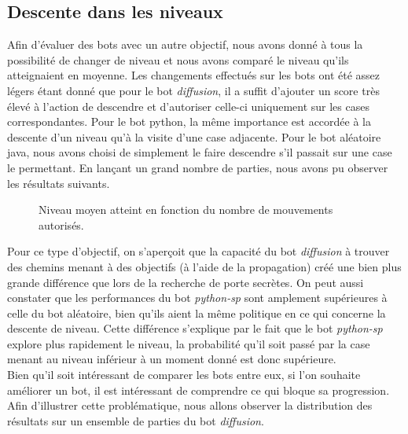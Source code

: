 \documentclass[a4paper,12pt]{article}
\begin{document}
\subsection{Descente dans les niveaux}

Afin d'évaluer des bots avec un autre objectif, nous avons donné à tous la
possibilité de changer de niveau et nous avons comparé le niveau qu'ils
atteignaient en moyenne. Les changements effectués sur les bots ont été assez
légers étant donné que pour le bot {\em diffusion}, il a suffit d'ajouter un
score très élevé à l'action de descendre et d'autoriser celle-ci uniquement sur
les cases correspondantes. Pour le bot python, la même importance est accordée
 à la descente d'un niveau qu'à la visite d'une case adjacente. Pour le bot
 aléatoire java, nous avons choisi de simplement le
faire descendre s'il passait sur une case le permettant. En lançant un grand
nombre de parties, nous avons pu observer les résultats suivants.

\begin{figure}[H]
  \caption{\label{fig:level_reached} Niveau moyen atteint en fonction du nombre
  de mouvements autorisés.}
\end{figure}

Pour ce type d'objectif, on s'aperçoit que la capacité du bot {\em diffusion} à
trouver des chemins menant à des objectifs (à l'aide de la propagation) créé une
bien plus grande différence que lors de la recherche de porte secrètes. On peut
aussi constater que les performances du bot {\em python-sp} sont amplement
supérieures à celle du bot aléatoire, bien qu'ils aient la même politique en ce
qui concerne la descente de niveau. Cette différence s'explique par le fait que
le bot {\em python-sp} explore plus rapidement le niveau, la probabilité qu'il
soit passé par la case menant au niveau inférieur à un moment donné est donc
supérieure.
\\
Bien qu'il soit intéressant de comparer les bots entre eux, si l'on souhaite
améliorer un bot, il est intéressant de comprendre ce qui bloque sa progression.
Afin d'illustrer cette problématique, nous allons observer la distribution des
résultats sur un ensemble de parties du bot {\em diffusion}.
\end{document}
